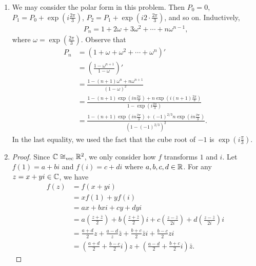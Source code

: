\documentclass[11pt]{article}
\begin{document}
\begin{enumerate}[label=\text{A1.\arabic*}.]
    \item %
        We may consider the polar form in this problem. Then $P_0 = 0$, $P_1 = P_ 0 + \exp\left( i \frac{2\pi}{3} \right)$, $P_2 = P_ 1+ \exp\left( i 2\cdot \frac{2\pi}{3} \right)$, and so on. Inductively,
        \begin{align*}
            P_n = 1 + 2\omega + 3\omega^2 + \cdots + n \omega^{n-1} \text{,}
        \end{align*}
        where $\omega = \exp\left(\frac{2\pi}{3}\right)$. Observe that
        \begin{align*}
            P_n &= (1 + \omega + \omega^2 + \cdots + \omega^n)' \\
            &= \left( \frac{1-\omega^{n+1}}{1-\omega} \right)' \\
            &= \frac{1- (n+1) \omega^n + n \omega^{n+1}}{(1-\omega)^2} \\
            &= \frac{1- (n+1) \exp\left(i n \frac{2\pi}{3} \right) + n \exp\left( i(n+1) \frac{2\pi}{3} \right)}{1 - \exp\left(i \frac{2\pi}{3}\right)} \\
            &= \frac{1- (n+1) \exp(in\frac{2\pi}{3}) + (-1)^{2/3} n \exp(in \frac{2\pi}{3})}{\left(1- (-1)^{2/3}\right)^2} \text{.}
        \end{align*}
        In the last equality, we used the fact that the cube root of $-1$ is $\exp\left(i\frac{\pi}{3}\right)$.
    
    \item %
        \begin{proof}
            Since $\mathbb{C} \cong_\mathrm{vec} \mathbb{R}^2$, we only consider how $f$ transforms $1$ and $i$. Let $f(1) = a + bi$ and $f(i) = c + di$ where $a,b,c,d \in \mathbb{R}$. For any $z=x+yi \in \mathbb{C}$, we have
            \begin{align*}
                f(z) &= f(x+yi) \\
                &= xf(1) + yf(i) \\
                &= ax + bx i + cy + dy i \\
                &= a \left( \frac{z+\bar{z}}{2} \right) + b \left( \frac{z+\bar{z}}{2} \right) i + c \left( \frac{z-\bar{z}}{2i} \right) + d \left( \frac{z-\bar{z}}{2i} \right) i \\
                &= \frac{a+d}{2} z + \frac{a-d}{z} \bar{z} + \frac{b+c}{2} \bar{z}i + \frac{b-c}{2} z i \\
                &= \left( \frac{a+d}{2} + \frac{b-c}{2} i \right) z + \left( \frac{a-d}{2} + \frac{b+c}{2} i \right) \bar{z} \text{.}
            \end{align*}
        \end{proof}
\end{enumerate}
\end{document}
